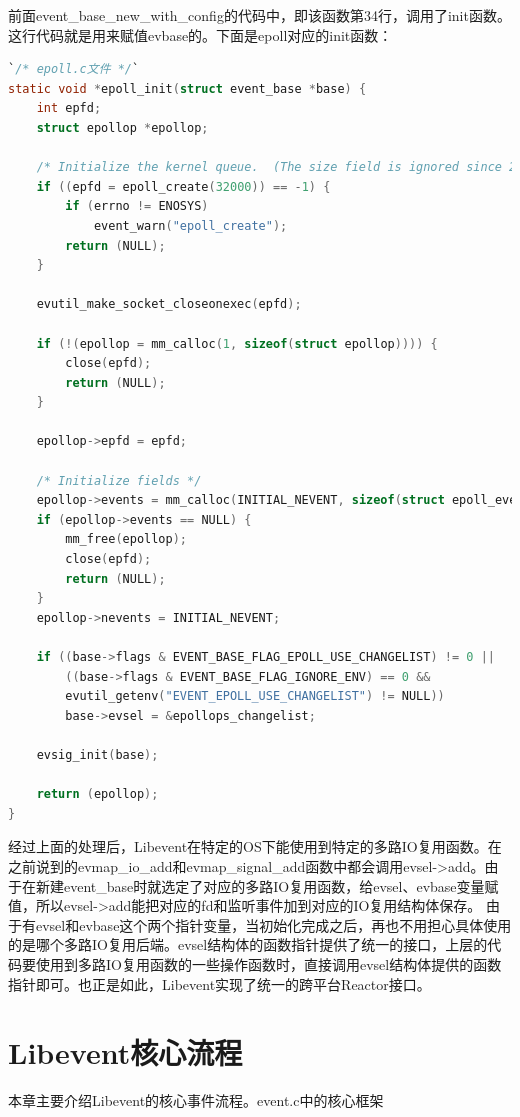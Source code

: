 \documentclass[11pt,a4paper]{article}
\begin{document}
前面event\_base\_new\_with\_config的代码中，即该函数第34行，调用了init函数。这行代码就是用来赋值evbase的。下面是epoll对应的init函数：
\begin{lstlisting}[language=C]
`/* epoll.c文件 */`
static void *epoll_init(struct event_base *base) {
	int epfd;
	struct epollop *epollop;

	/* Initialize the kernel queue.  (The size field is ignored since 2.6.8.) */
	if ((epfd = epoll_create(32000)) == -1) {
		if (errno != ENOSYS)
			event_warn("epoll_create");
		return (NULL);
	}

	evutil_make_socket_closeonexec(epfd);

	if (!(epollop = mm_calloc(1, sizeof(struct epollop)))) {
		close(epfd);
		return (NULL);
	}

	epollop->epfd = epfd;

	/* Initialize fields */
	epollop->events = mm_calloc(INITIAL_NEVENT, sizeof(struct epoll_event));
	if (epollop->events == NULL) {
		mm_free(epollop);
		close(epfd);
		return (NULL);
	}
	epollop->nevents = INITIAL_NEVENT;

	if ((base->flags & EVENT_BASE_FLAG_EPOLL_USE_CHANGELIST) != 0 ||
	    ((base->flags & EVENT_BASE_FLAG_IGNORE_ENV) == 0 &&
		evutil_getenv("EVENT_EPOLL_USE_CHANGELIST") != NULL))
		base->evsel = &epollops_changelist;

	evsig_init(base);

	return (epollop);
}
\end{lstlisting}
经过上面的处理后，Libevent在特定的OS下能使用到特定的多路IO复用函数。在之前说到的evmap\_io\_add和evmap\_signal\_add函数中都会调用evsel->add。由于在新建event\_base时就选定了对应的多路IO复用函数，给evsel、evbase变量赋值，所以evsel->add能把对应的fd和监听事件加到对应的IO复用结构体保存。
由于有evsel和evbase这个两个指针变量，当初始化完成之后，再也不用担心具体使用的是哪个多路IO复用后端。evsel结构体的函数指针提供了统一的接口，上层的代码要使用到多路IO复用函数的一些操作函数时，直接调用evsel结构体提供的函数指针即可。也正是如此，Libevent实现了统一的跨平台Reactor接口。

\newpage

\section{Libevent核心流程}
本章主要介绍Libevent的核心事件流程。event.c中的核心框架
\end{document}
